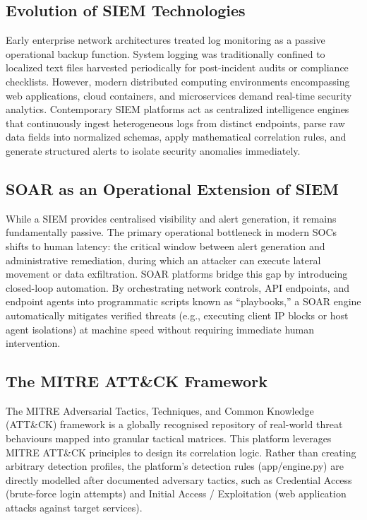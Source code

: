 \subsection{Evolution of SIEM Technologies}

Early enterprise network architectures treated log monitoring as a passive operational backup function. System logging was traditionally confined to localized text files harvested periodically for post-incident audits or compliance checklists. However, modern distributed computing environments encompassing web applications, cloud containers, and microservices demand real-time security analytics. Contemporary SIEM platforms act as centralized intelligence engines that continuously ingest heterogeneous logs from distinct endpoints, parse raw data fields into normalized schemas, apply mathematical correlation rules, and generate structured alerts to isolate security anomalies immediately.

\subsection{SOAR as an Operational Extension of SIEM}

While a SIEM provides centralised visibility and alert generation, it remains fundamentally passive. The primary operational bottleneck in modern SOCs shifts to human latency: the critical window between alert generation and administrative remediation, during which an attacker can execute lateral movement or data exfiltration. SOAR platforms bridge this gap by introducing closed-loop automation. By orchestrating network controls, API endpoints, and endpoint agents into programmatic scripts known as ``playbooks,'' a SOAR engine automatically mitigates verified threats (e.g., executing client IP blocks or host agent isolations) at machine speed without requiring immediate human intervention.

\subsection{The MITRE ATT\&CK Framework}

The MITRE Adversarial Tactics, Techniques, and Common Knowledge (ATT\&CK) framework is a globally recognised repository of real-world threat behaviours mapped into granular tactical matrices. This platform leverages MITRE ATT\&CK principles to design its correlation logic. Rather than creating arbitrary detection profiles, the platform's detection rules (app/engine.py) are directly modelled after documented adversary tactics, such as Credential Access (brute-force login attempts) and Initial Access / Exploitation (web application attacks against target services).

